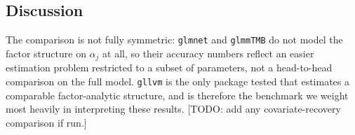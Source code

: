 \subsection{Discussion}

The comparison is not fully symmetric: \texttt{glmnet} and \texttt{glmmTMB} do not model the factor structure on $\alpha_j$ at all, so their accuracy numbers reflect an easier estimation problem restricted to a subset of parameters, not a head-to-head comparison on the full model. \texttt{gllvm} is the only package tested that estimates a comparable factor-analytic structure, and is therefore the benchmark we weight most heavily in interpreting these results. [TODO: add any covariate-recovery comparison if run.]
\fi


